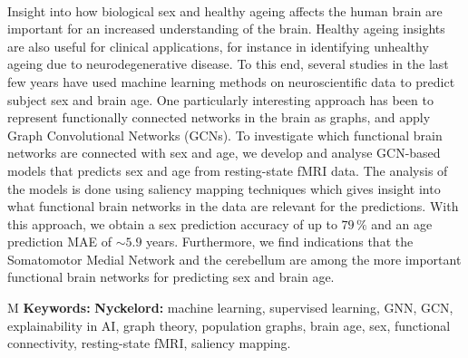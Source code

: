 \thesisImprintTitle\\
\thesisImprintSubtitle\\
\thesisAuthor\\
\thesisDepartment\\
\thesisUniversity\setlength{\parskip}{0.5cm}

\thispagestyle{plain}			%
\section*{\abstractname}

Insight into how biological sex and healthy ageing affects the human brain are important for an increased understanding of the brain. Healthy ageing insights are also useful for clinical applications, for instance in identifying unhealthy ageing due to neurodegenerative disease. To this end, several studies in the last few years have used machine learning methods on neuroscientific data to predict subject sex and brain age. One particularly interesting approach has been to represent functionally connected networks in the brain as graphs, and apply Graph Convolutional Networks (GCNs). To investigate which functional brain networks are connected with sex and age, we develop and analyse GCN-based models that predicts sex and age from resting-state fMRI data. The analysis of the models is done using saliency mapping techniques which gives insight into what functional brain networks in the data are relevant for the predictions. With this approach, we obtain a sex prediction accuracy of up to $79\,\%$ and an age prediction MAE of $\sim5.9$ years. Furthermore, we find indications that the Somatomotor Medial Network and the cerebellum are among the more important functional brain networks for predicting sex and brain age.

\vfill
\if\thesisType M
    \textbf{Keywords:}
\else
    \textbf{Nyckelord:}
\fi
machine learning, supervised learning, GNN, GCN, explainability in AI, graph theory, population graphs, brain age, sex, functional connectivity, resting-state fMRI, saliency mapping.
\if{}
\newpage				%
\thispagestyle{empty}
\mbox{}
\fi
